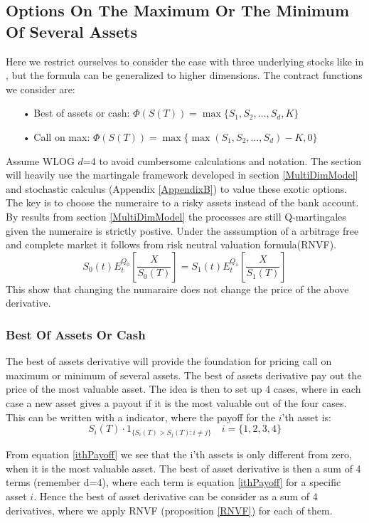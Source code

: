 \subsection{Options On The Maximum Or The Minimum Of Several Assets}
Here we restrict ourselves to consider the case with three underlying stocks like in \parencite{BEG, Ouwehand2006}, but the formula can be generalized to higher dimensions. The contract functions we consider are:
\begin{enumerate}
\item[•] Best of assets or cash: $\Phi(S(T))=\max\{S_1,S_2,\ldots,S_d,K\}$
\item[•] Call on max: $\Phi(S(T))=\max\{\max(S_1,S_2,\ldots,S_d)-K,0\}$
\end{enumerate}
Assume WLOG $d$=4 to avoid cumbersome calculations and notation. The section will heavily use the martingale framework developed in section \ref{MultiDimModel} and stochastic calculus (Appendix \ref{AppendixB}) to value these exotic options. The key is to choose the numeraire to a risky assets instead of the bank account. By results from section \ref{MultiDimModel} the processes are still Q-martingales given the numeraire is strictly postive. Under the asssumption of a arbitrage free and complete market it follows from risk neutral valuation formula(RNVF).
$$S_0(t)E^{Q_0}_t[\frac{X}{S_0(T)}]=S_1(t)E^{Q_1}_t[\frac{X}{S_1(T)}]$$
This show that changing the numaraire does not change the price of the above derivative.

\subsubsection{Best Of Assets Or Cash}
The best of assets derivative will provide the foundation for pricing call on maximum or minimum of several assets. The best of assets derivative pay out the price of the most valuable asset. The idea is then to set up 4 cases, where in each case a new asset gives a payout if it is the most valuable out of the four cases. This can be written with a indicator, where the payoff for the $i$'th asset is:
\begin{equation}\label{ithPayoff}
S_i(T) \cdot 1_{\{S_i(T)>S_j(T): i\neq j\}} \quad i=\{1,2,3,4\}
\end{equation}

From equation \eqref{ithPayoff} we see that the i'th assets is only different from zero, when it is the most valuable asset. The best of asset derivative is then a sum of 4 terms (remember d=4), where each term is equation \eqref{ithPayoff} for a specific asset $i$. Hence the best of asset derivative can be consider as a sum of 4 derivatives, where we apply RNVF (proposition \ref{RNVF}) for each of them.\\

